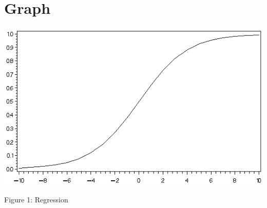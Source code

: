 \documentclass[12pt]{article}
\begin{document}
\section{Graph}

\includegraphics{graph}

Figure 1: Regression
\end{document}
